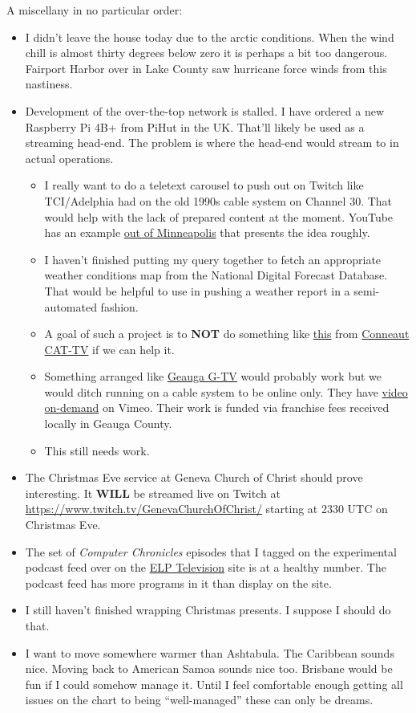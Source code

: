A miscellany in no particular order:

\begin{itemize}
\tightlist
\item
  I didn't leave the house today due to the arctic conditions. When the
  wind chill is almost thirty degrees below zero it is perhaps a bit too
  dangerous. Fairport Harbor over in Lake County saw hurricane force
  winds from this nastiness.
\item
  Development of the over-the-top network is stalled. I have ordered a
  new Raspberry Pi 4B+ from PiHut in the UK. That'll likely be used as a
  streaming head-end. The problem is where the head-end would stream to
  in actual operations.

  \begin{itemize}
  \tightlist
  \item
    I really want to do a teletext carousel to push out on Twitch like
    TCI/Adelphia had on the old 1990s cable system on Channel 30. That
    would help with the lack of prepared content at the moment. YouTube
    has an example \href{https://youtu.be/bhw25jFm5So}{out of
    Minneapolis} that presents the idea roughly.
  \item
    I haven't finished putting my query together to fetch an appropriate
    weather conditions map from the National Digital Forecast Database.
    That would be helpful to use in pushing a weather report in a
    semi-automated fashion.
  \item
    A goal of such a project is to \textbf{NOT} do something like
    \href{https://vimeo.com/783282497}{this} from
    \href{https://vimeo.com/user126359532}{Conneaut CAT-TV} if we can
    help it.
  \item
    Something arranged like \href{https://geaugatv.org/contact}{Geauga
    G-TV} would probably work but we would ditch running on a cable
    system to be online only. They have
    \href{https://vimeo.com/gtvvideos}{video on-demand} on Vimeo. Their
    work is funded via franchise fees received locally in Geauga County.
  \item
    This still needs work.
  \end{itemize}
\item
  The Christmas Eve service at Geneva Church of Christ should prove
  interesting. It \textbf{WILL} be streamed live on Twitch at
  \url{https://www.twitch.tv/GenevaChurchOfChrist/} starting at 2330 UTC
  on Christmas Eve.
\item
  The set of \emph{Computer Chronicles} episodes that I tagged on the
  experimental podcast feed over on the \href{https://coyote.works}{ELP
  Television} site is at a healthy number. The podcast feed has more
  programs in it than display on the site.
\item
  I still haven't finished wrapping Christmas presents. I suppose I
  should do that.
\item
  I want to move somewhere warmer than Ashtabula. The Caribbean sounds
  nice. Moving back to American Samoa sounds nice too. Brisbane would be
  fun if I could somehow manage it. Until I feel comfortable enough
  getting all issues on the chart to being ``well-managed'' these can
  only be dreams.


\end{itemize}
